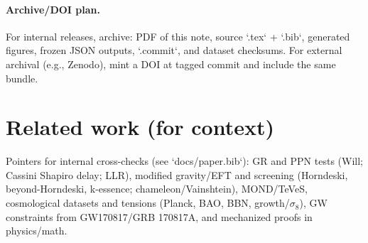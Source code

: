 \documentclass[11pt]{article}
\begin{document}
\paragraph{Archive/DOI plan.}
For internal releases, archive: PDF of this note, source `.tex` + `.bib`, generated figures, frozen JSON outputs, `.commit`, and dataset checksums. For external archival (e.g., Zenodo), mint a DOI at tagged commit and include the same bundle.

\section*{Related work (for context)}
Pointers for internal cross-checks (see `docs/paper.bib`): GR and PPN tests (Will; Cassini Shapiro delay; LLR), modified gravity/EFT and screening (Horndeski, beyond-Horndeski, k-essence; chameleon/Vainshtein), MOND/TeVeS, cosmological datasets and tensions (Planck, BAO, BBN, growth/$\sigma_8$), GW constraints from GW170817/GRB 170817A, and mechanized proofs in physics/math.
\end{document}
